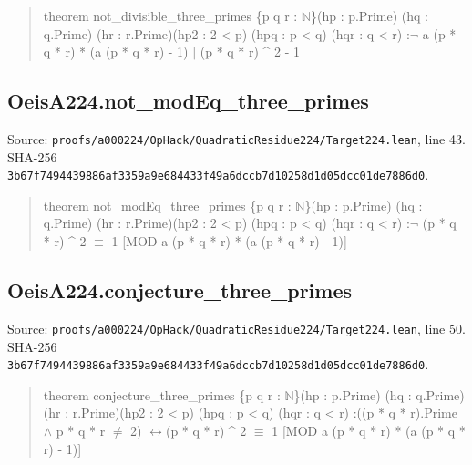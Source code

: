 \documentclass[11pt,a4paper]{article}
\begin{document}
\begin{quote}\small\ttfamily theorem not\_divisible\_three\_primes \{p q r : \ensuremath{\mathbb{N}}\}\newline (hp : p.Prime) (hq : q.Prime) (hr : r.Prime)\newline (hp2 : 2 < p) (hpq : p < q) (hqr : q < r) :\newline \ensuremath{\neg} a (p * q * r) * (a (p * q * r) - 1) \ensuremath{\mid} (p * q * r) \textasciicircum{} 2 - 1\end{quote}
\subsection{OeisA224.not\_modEq\_three\_primes}
Source: \texttt{proofs/a000224/OpHack/QuadraticResidue224/Target224.lean}, line 43. SHA-256 \texttt{3b67f7494439886af3359a9e684433f49a6dccb7d10258d1d05dcc01de7886d0}.

\begin{quote}\small\ttfamily theorem not\_modEq\_three\_primes \{p q r : \ensuremath{\mathbb{N}}\}\newline (hp : p.Prime) (hq : q.Prime) (hr : r.Prime)\newline (hp2 : 2 < p) (hpq : p < q) (hqr : q < r) :\newline \ensuremath{\neg} (p * q * r) \textasciicircum{} 2 \ensuremath{\equiv} 1 [MOD a (p * q * r) * (a (p * q * r) - 1)]\end{quote}
\subsection{OeisA224.conjecture\_three\_primes}
Source: \texttt{proofs/a000224/OpHack/QuadraticResidue224/Target224.lean}, line 50. SHA-256 \texttt{3b67f7494439886af3359a9e684433f49a6dccb7d10258d1d05dcc01de7886d0}.

\begin{quote}\small\ttfamily theorem conjecture\_three\_primes \{p q r : \ensuremath{\mathbb{N}}\}\newline (hp : p.Prime) (hq : q.Prime) (hr : r.Prime)\newline (hp2 : 2 < p) (hpq : p < q) (hqr : q < r) :\newline ((p * q * r).Prime \ensuremath{\wedge} p * q * r \ensuremath{\neq} 2) \ensuremath{\leftrightarrow}\newline (p * q * r) \textasciicircum{} 2 \ensuremath{\equiv} 1 [MOD a (p * q * r) * (a (p * q * r) - 1)]\end{quote}
\end{document}
